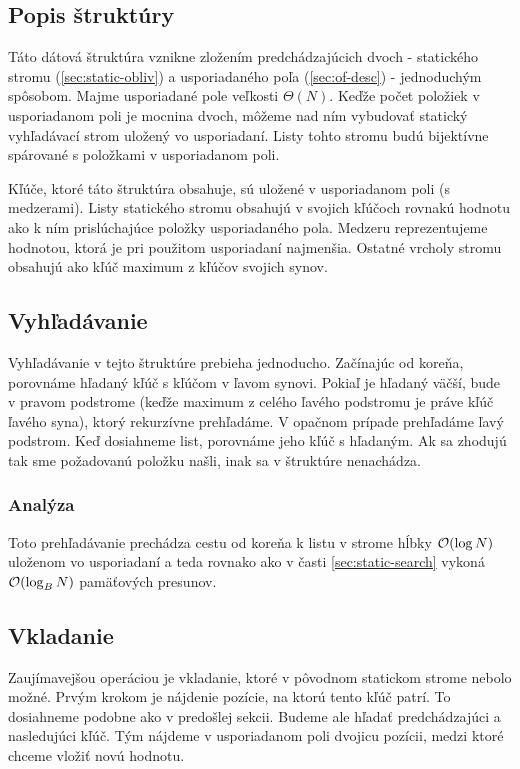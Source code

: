 \subsection{Popis \obliv štruktúry}
Táto dátová štruktúra vznikne zložením predchádzajúcich dvoch - statického stromu (\ref{sec:static-obliv}) a usporiadaného poľa (\ref{sec:of-desc}) - jednoduchým spôsobom. Majme usporiadané pole veľkosti $\Theta(N)$. Keďže počet položiek v usporiadanom poli je mocnina dvoch, môžeme nad ním vybudovať statický vyhľadávací strom uložený vo \vEB usporiadaní. Listy tohto stromu budú bijektívne spárované s položkami v usporiadanom poli.

Kľúče, ktoré táto štruktúra obsahuje, sú uložené v usporiadanom poli (s medzerami). Listy statického stromu obsahujú v svojich kľúčoch rovnakú hodnotu ako k ním prislúchajúce položky usporiadaného pola. Medzeru reprezentujeme hodnotou, ktorá je pri použitom usporiadaní najmenšia. Ostatné vrcholy stromu obsahujú ako kľúč maximum z kľúčov svojich synov.

\subsection{Vyhľadávanie} \label{sec:dynamic-obliv-search}
Vyhľadávanie v tejto štruktúre prebieha jednoducho. Začínajúc od koreňa, porovnáme hľadaný kľúč s kľúčom v ľavom synovi. Pokiaľ je hľadaný väčší, bude v pravom podstrome (keďže maximum z celého ľavého podstromu je práve kľúč ľavého syna), ktorý rekurzívne prehľadáme. V opačnom prípade prehľadáme ľavý podstrom. Keď dosiahneme list, porovnáme jeho kľúč s hľadaným. Ak sa zhodujú tak sme požadovanú položku našli, inak sa v štruktúre nenachádza. 

\subsubsection{Analýza}

Toto prehľadávanie prechádza cestu od koreňa k listu v strome hĺbky $\mathcal{O}(\log{N})$ uloženom vo \vEB usporiadaní a teda rovnako ako v časti \ref{sec:static-search} vykoná $\mathcal{O}(\log_B{N})$ pamäťových presunov.

\subsection{Vkladanie}
Zaujímavejšou operáciou je vkladanie, ktoré v pôvodnom statickom strome nebolo možné. Prvým krokom je nájdenie pozície, na ktorú tento kľúč patrí. To dosiahneme podobne ako v predošlej sekcii. Budeme ale hľadať predchádzajúci a nasledujúci kľúč. Tým nájdeme v usporiadanom poli dvojicu pozícii, medzi ktoré chceme vložiť novú hodnotu.

